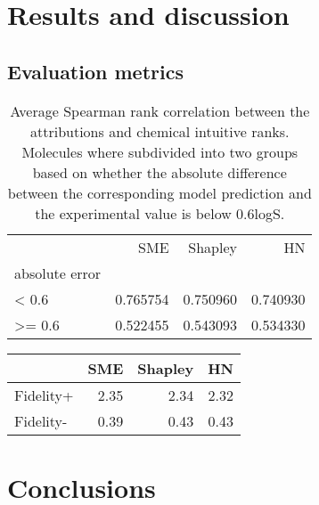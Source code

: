 \documentclass[twoside,twocolumn,9pt]{article}
\renewcommand{\refname}{Notes and references}
\begin{document}
\newpage
\section{Results and discussion}


\subsection{Evaluation metrics}


\begin{center}
\begin{table}[H]
    \caption{Average Spearman rank correlation between the attributions and chemical intuitive ranks. Molecules where 
        subdivided into two groups based on whether the absolute difference between the corresponding model prediction 
        and the experimental value is below $0.6$logS.
    }
\begin{tabular}{lrrr}
\toprule
 & SME  & Shapley  & HN  \\
absolute error &  &  &  \\
\midrule
< 0.6 & 0.765754 & 0.750960 & 0.740930 \\
>= 0.6 & 0.522455 & 0.543093 & 0.534330 \\
 \bottomrule
\end{tabular}
\end{table}
\end{center}






\begin{center}
\begin{tabular}{lrrr}
\toprule
 & SME & Shapley  & HN \\
\midrule
Fidelity+ & 2.35 & 2.34 & 2.32 \\
Fidelity- & 0.39 & 0.43 & 0.43 \\
 \bottomrule
\end{tabular}
\end{center}


\section{Conclusions}



\balance



\newpage
\appendix
{}
\renewcommand{\thesection}{A.\arabic{section}}
\end{document}
